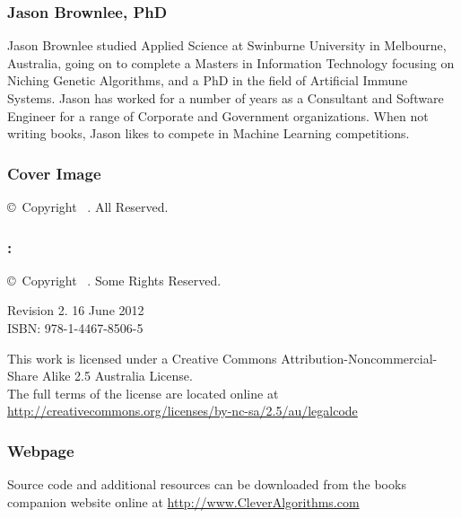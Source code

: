 

\vspace*{\fill}
\begin{flushleft}
\begin{small}

\subsubsection*{Jason Brownlee, PhD}
Jason Brownlee studied Applied Science at Swinburne University in Melbourne, Australia, going on to complete a Masters in Information Technology focusing on Niching Genetic Algorithms, and a PhD in the field of Artificial Immune Systems. Jason has worked for a number of years as a Consultant and Software Engineer for a range of Corporate and Government organizations. When not writing books, Jason likes to compete in Machine Learning competitions.

\subsubsection*{Cover Image}
\copyright\ Copyright \mybookdate\ \mybookauthor. All Reserved. \\
\vspace{0.5cm}

\subsubsection*{\mybooktitle: \mybooksubtitle}
\copyright\ Copyright \mybookdate\ \mybookauthor. Some Rights Reserved. \\
\vspace{0.5cm}

Revision 2. 16 June 2012 \\
ISBN: 978-1-4467-8506-5 \\
\vspace{0.5cm}

This work is licensed under a Creative Commons Attribution\--Noncommercial\--Share Alike 2.5 Australia License. \\
The full terms of the license are located online at \url{http://creativecommons.org/licenses/by-nc-sa/2.5/au/legalcode} \\
\vspace{0.5cm}

\subsubsection*{Webpage}
Source code and additional resources can be downloaded from the books companion website online at \url{http://www.CleverAlgorithms.com}

\end{small}
\end{flushleft}

